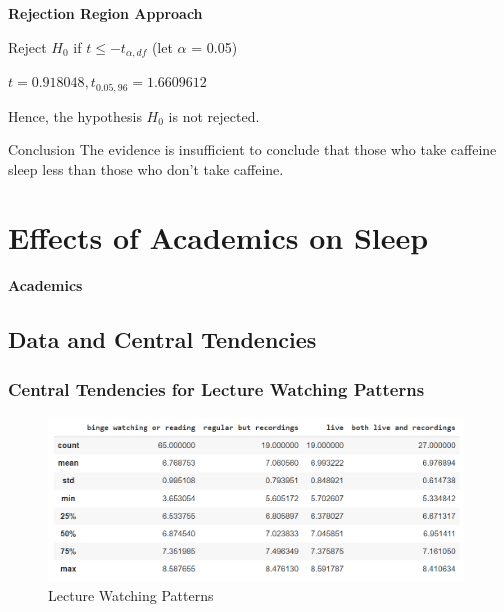 \documentclass[11pt,]{beamer}
\begin{document}
\begin{frame}[fragile, t]

    \textbf{Rejection Region Approach}
    
    \bigskip
    
    Reject $H_0$ if $t \leq -t_{\alpha, df}$ (let $\alpha$ = 0.05)
    
    \bigskip
    
    $t = 0.918048, t_{0.05, 96} = 1.6609612$ 
    
    \bigskip
    
    Hence, the hypothesis $H_{0}$ is not rejected. 
    
    \bigskip
    
    \begin{block}{Conclusion}
    The evidence is insufficient to conclude that those who take caffeine sleep less than those who don't take caffeine.
    \end{block}
    
\end{frame}

\section{Effects of Academics on Sleep}

\begin{frame}

    \begin{block}{\textbf{Academics}}
    \end{block}
\end{frame}

\subsection{Data and Central Tendencies}

\begin{frame}

    \frametitle{Central Tendencies for Lecture Watching Patterns}
    
    \begin{figure}
		\includegraphics[width=11cm]{DF_Lectures.png}
		\caption{Lecture Watching Patterns}
	\end{figure}
    
\end{frame}
\end{document}
